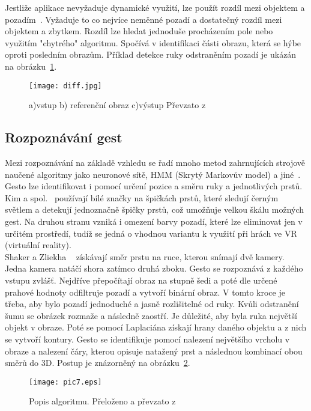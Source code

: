 Jestliže aplikace nevyžaduje dynamické využití, lze použít rozdíl mezi objektem a pozadím~\cite{14}. Vyžaduje to co nejvíce neměnné pozadí a dostatečný rozdíl mezi objektem a zbytkem. Rozdíl lze hledat jednoduše procházením pole nebo využitím "chytrého" algoritmu. Spočívá v identifikaci části obrazu, která se hýbe oproti posledním obrazům. Příklad detekce ruky odstraněním pozadí je ukázán na obrázku~\ref{pic6}.

\begin{figure}[h]
\centering
\texttt{[image: diff.jpg]}
\caption{a)vstup  b) referenční obraz  c)výstup 
Převzato z ~\cite{14} } 
\label{pic6}
\end{figure}


\subsection{Rozpoznávání gest}
Mezi rozpoznávání na základě vzhledu se řadí mnoho metod zahrnujících strojově naučené algoritmy jako neuronové sítě, HMM (Skrytý Markovův model) a jiné~\cite{3}. Gesto lze identifikovat i pomocí určení pozice a směru ruky a jednotlivých prstů.\\ %

Kim a spol.~\cite{5} používají bílé značky na špičkách prstů, které sledují černým světlem a detekují jednoznačně špičky prstů, což umožňuje velkou škálu možných gest. Na druhou stranu vzniká i omezení barvy pozadí, které lze eliminovat jen v určitém prostředí, tudíž se jedná o vhodnou variantu k využití při hrách ve VR (virtuální reality).\\

Shaker a Zliekha ~\cite{12} získávají směr prstu na ruce, kterou snímají dvě kamery. Jedna kamera natáčí shora zatímco druhá zboku. Gesto se rozpoznává z každého vstupu zvlášť. Nejdříve přepočítají obraz na stupně šedi a poté dle určené prahové hodnoty odfiltruje pozadí a vytvoří binární obraz. V tomto kroce je třeba, aby bylo pozadí jednoduché a jasně rozlišitelné od ruky. Kvůli odstranění šumu se obrázek rozmaže a následně zaostří. Je důležité, aby byla ruka největší objekt v obraze. Poté se pomocí Laplaciána získají hrany daného objektu a z nich se vytvoří kontury.
Gesto se identifikuje pomocí nalezení největšího vrcholu v obraze a nalezení čáry, kterou opisuje natažený prst a následnou kombinací obou směrů do 3D. Postup je znázorněný na obrázku~\ref{pic7}.

\begin{figure}[h]
\centering
\texttt{[image: pic7.eps]}
\caption{Popis algoritmu. Přeloženo a převzato z ~\cite{12} } 
\label{pic7}
\end{figure}

